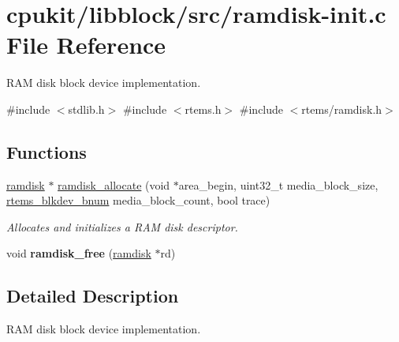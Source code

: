\hypertarget{ramdisk-init_8c}{}\section{cpukit/libblock/src/ramdisk-\/init.c File Reference}
\label{ramdisk-init_8c}


R\+AM disk block device implementation.  


{\ttfamily \#include $<$stdlib.\+h$>$}\newline
{\ttfamily \#include $<$rtems.\+h$>$}\newline
{\ttfamily \#include $<$rtems/ramdisk.\+h$>$}\newline
\subsection*{Functions}
\begin{DoxyCompactItemize}
\item 
\mbox{\hyperlink{structramdisk}{ramdisk}} $\ast$ \mbox{\hyperlink{group__rtems__ramdisk_gac6c99eed9f3b92bb4cf5184b25972e65}{ramdisk\+\_\+allocate}} (void $\ast$area\+\_\+begin, uint32\+\_\+t media\+\_\+block\+\_\+size, \mbox{\hyperlink{group__rtems__disk_ga5fbcfd40b657bff6c54d9e393fab3274}{rtems\+\_\+blkdev\+\_\+bnum}} media\+\_\+block\+\_\+count, bool trace)
\begin{DoxyCompactList}\small\item\em Allocates and initializes a R\+AM disk descriptor. \end{DoxyCompactList}\item 
void {\bfseries ramdisk\+\_\+free} (\mbox{\hyperlink{structramdisk}{ramdisk}} $\ast$rd)
\end{DoxyCompactItemize}


\subsection{Detailed Description}
R\+AM disk block device implementation. 

